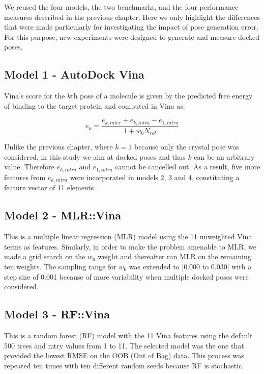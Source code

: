 We reused the four models, the two benchmarks, and the four performance measures described in the previous chapter. Here we only highlight the differences that were made particularly for investigating the impact of pose generation error. For this purpose, new experiments were designed to generate and measure docked poses.

\subsection{Model 1 - AutoDock Vina}

Vina's score for the $k$th pose of a molecule is given by the predicted free energy of binding to the target protein and computed in Vina as:

\begin{equation}
\label{rfscore4:e_k}
e_k=\frac{e_{k,inter}+e_{k,intra}-e_{1,intra}}{1+w_6N_{rot}}
\end{equation}

Unlike the previous chapter, where $k=1$ because only the crystal pose was considered, in this study we aim at docked poses and thus $k$ can be an arbitrary value. Therefore $e_{k,intra}$ and $e_{1,intra}$ cannot be cancelled out. As a result, five more features from $e_{k,intra}$ were incorporated in models 2, 3 and 4, constituting a feature vector of 11 elements.

\subsection{Model 2 - MLR::Vina}

This is a multiple linear regression (MLR) model using the 11 unweighted Vina terms as features. Similarly, in order to make the problem amenable to MLR, we made a grid search on the $w_6$ weight and thereafter ran MLR on the remaining ten weights. The sampling range for $w_6$ was extended to [0.000 to 0.030] with a step size of 0.001 because of more variability when multiple docked poses were considered.

\subsection{Model 3 - RF::Vina}

This is a random forest (RF) model with the 11 Vina features using the default 500 trees and mtry values from 1 to 11. The selected model was the one that provided the lowest RMSE on the OOB (Out of Bag) data. This process was repeated ten times with ten different random seeds because RF is stochastic.

